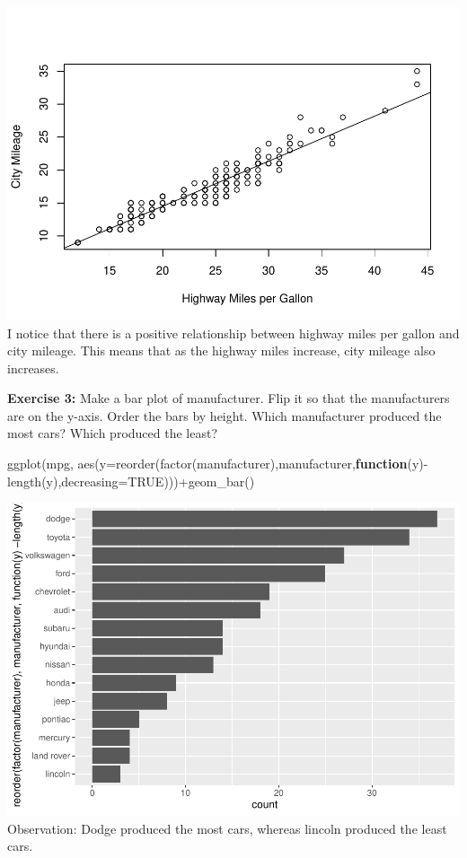\documentclass[
]{article}
\newenvironment{Shaded}{\begin{snugshade}}{\end{snugshade}}
\newcommand{\AttributeTok}[1]{\textcolor[rgb]{0.77,0.63,0.00}{#1}}
\newcommand{\ConstantTok}[1]{\textcolor[rgb]{0.00,0.00,0.00}{#1}}
\newcommand{\ControlFlowTok}[1]{\textcolor[rgb]{0.13,0.29,0.53}{\textbf{#1}}}
\newcommand{\FunctionTok}[1]{\textcolor[rgb]{0.00,0.00,0.00}{#1}}
\newcommand{\NormalTok}[1]{#1}
\newcommand{\SpecialCharTok}[1]{\textcolor[rgb]{0.00,0.00,0.00}{#1}}
\begin{document}
\includegraphics{PSTAT131-HW1_files/figure-latex/unnamed-chunk-2-1.pdf}
I notice that there is a positive relationship between highway miles per
gallon and city mileage. This means that as the highway miles increase,
city mileage also increases.

\textbf{Exercise 3:} Make a bar plot of manufacturer. Flip it so that
the manufacturers are on the y-axis. Order the bars by height. Which
manufacturer produced the most cars? Which produced the least?

\begin{Shaded}
\begin{Highlighting}[]
\FunctionTok{ggplot}\NormalTok{(mpg, }\FunctionTok{aes}\NormalTok{(}\AttributeTok{y=}\FunctionTok{reorder}\NormalTok{(}\FunctionTok{factor}\NormalTok{(manufacturer),manufacturer,}\ControlFlowTok{function}\NormalTok{(y)}\SpecialCharTok{{-}}\FunctionTok{length}\NormalTok{(y),}\AttributeTok{decreasing=}\ConstantTok{TRUE}\NormalTok{)))}\SpecialCharTok{+}\FunctionTok{geom\_bar}\NormalTok{() }
\end{Highlighting}
\end{Shaded}

\includegraphics{PSTAT131-HW1_files/figure-latex/unnamed-chunk-3-1.pdf}
Observation: Dodge produced the most cars, whereas lincoln produced the
least cars.
\end{document}

